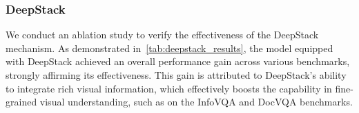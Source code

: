 \documentclass{article} %
\begin{document}
\begin{table}[h]
\centering
\caption{\textbf{Ablation on Qwen3-ViT.} We compare the performance metrics of Qwen3-ViT and SigLIP-2 during the CLIP pre-training stage, and further evaluate their downstream performance in the vision-language modeling (VLM) stage when paired with the same 1.7B Qwen3 language model.}
\label{tab:Qwen3_ViT_results}
\setlength{\tabcolsep}{3.0pt}
\end{table}




\subsubsection{DeepStack}
We conduct an ablation study to verify the effectiveness of the DeepStack mechanism. As demonstrated in~\cref{tab:deepstack_results}, the model equipped with DeepStack achieved an overall performance gain across various benchmarks, strongly affirming its effectiveness. This gain is attributed to DeepStack's ability to integrate rich visual information, which effectively boosts the capability in fine-grained visual understanding, such as on the InfoVQA and DocVQA benchmarks.
\end{document}
